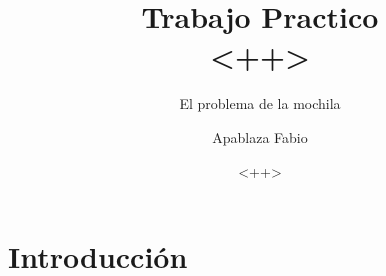 \documentclass{beamer}
\title[<++>]{Trabajo Practico\\ <++>}
\subtitle{ El problema de la mochila}
\author{Apablaza Fabio}
\institute{Universidad Nacional del Comahue}
\date{<++>}
\begin{document}
\begin{frame}
\tableofcontents
\end{frame}

\section{Introducción}
\begin{frame}

\end{frame}
\end{document}
